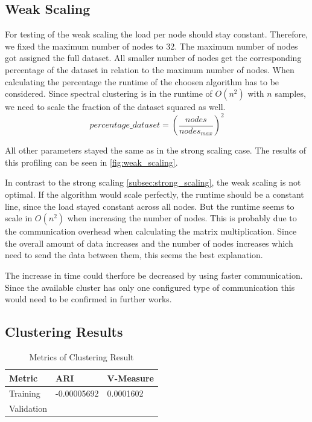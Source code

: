 \subsection{Weak Scaling}
\label{subsec:weak_scaling}

For testing of the weak scaling the load per node should stay constant. Therefore, we fixed the
maximum number of nodes to 32.
The maximum number of nodes got assigned the full dataset. All smaller number of nodes get the corresponding
percentage of the dataset in relation to the maximum number of nodes. When calculating the percentage the runtime
of the choosen algorithm has to be considered. Since spectral clustering is in the runtime of \(O(n^2)\) with \(n\) samples,
we need to scale the fraction of the dataset squared as well.
\[percentage\_dataset = \left(\frac{nodes}{nodes_{max}}\right)^2\]

All other parameters stayed the same as in the strong scaling case.
The results of this profiling can be seen in \cref{fig:weak_scaling}.

In contrast to the strong scaling \cref{subsec:strong_scaling}, the weak scaling is not optimal. If the algorithm would scale perfectly, the runtime should be a
constant line, since the load stayed constant across all nodes. But the runtime seems to scale in \(O(n^2)\) when increasing the number of nodes.
This is probably due to the communication overhead when calculating the matrix multiplication.
Since the overall amount of data increases and the number of nodes increases which need to send the data between them, this seems the best explanation.

The increase in time could therfore be decreased by using faster communication. Since the available cluster has only one configured type of communication
this would need to be confirmed in further works.


\subsection{Clustering Results}
\label{subsec:clustering_results}

\begin{table}
    \centering
    \begin{tabular}{lll}
      \toprule
      Metric     &  ARI & V-Measure \\
      \midrule
      Training   &  -0.00005692  &  0.0001602     \\
      Validation &   & \\
      \bottomrule
    \end{tabular}
    \caption{Metrics of Clustering Result}
    \label{tab:clustering_results}
  \end{table}

